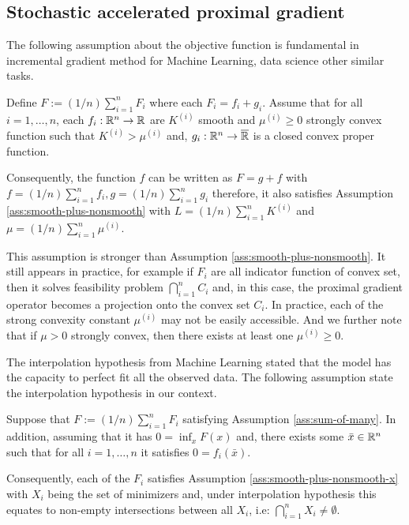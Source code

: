 \documentclass[12pt]{article}
\begin{document}
    \subsection{Stochastic accelerated proximal gradient}
        The following assumption about the objective function is fundamental in incremental gradient method for Machine Learning, data science other similar tasks. 
        \begin{assumption}\label{ass:sum-of-many}
            Define $F := (1/n)\sum_{i = 1}^{n} F_i$ where each $F_i = f_i + g_i$.
            Assume that for all $i = 1, \ldots, n$, each $f_i:\mathbb R^n \rightarrow \mathbb R$ are $K^{(i)}$ smooth and $\mu^{(i)} \ge 0$ strongly convex function such that $K^{(i)} > \mu^{(i)}$ and, $g_i:\mathbb R^n \rightarrow \overline {\mathbb R}$ is a closed convex proper function. 
            \par 
            Consequently, the function $f$ can be written as $F = g + f$ with $f = (1/n)\sum_{i = 1}^{n} f_i, g = (1/n)\sum_{i = 1}^{n}g_i$ therefore, it also satisfies Assumption \ref{ass:smooth-plus-nonsmooth} with $L = (1/n)\sum_{i = 1}^n K^{(i)}$ and $\mu = (1/n)\sum_{i = 1}^{n}\mu^{(i)}$. 
        \end{assumption}
        This assumption is stronger than Assumption \ref{ass:smooth-plus-nonsmooth}. 
        It still appears in practice, for example if $F_i$ are all indicator function of convex set, then it solves feasibility problem $\bigcap_{i = 1}^n C_i$ and, in this case, the proximal gradient operator becomes a projection onto the convex set $C_i$. 
        In practice, each of the strong convexity constant $\mu^{(i)}$ may not be easily accessible. 
        And we further note that if $\mu > 0$ strongly convex, then there exists at least one $\mu^{(i)} \ge 0$. 
        \par
        The interpolation hypothesis from Machine Learning stated that the model has the capacity to perfect fit all the observed data. 
        The following assumption state the interpolation hypothesis in our context. 
        \begin{assumption}\label{ass:interp-hypothesis}
            Suppose that $F := (1/n)\sum_{i = 1}^{n} F_i$ satisfying Assumption \ref{ass:sum-of-many}. 
            In addition, assuming that it has $0 = \inf_{x}F(x)$ and, there exists some $\bar x \in \mathbb R^n$ such that for all $i = 1, \ldots, n$ it satisfies $0 = f_i(\bar x)$. 
            \par
            Consequently, each of the $F_i$ satisfies Assumption \ref{ass:smooth-plus-nonsmooth-x} with $X_i$ being the set of minimizers and, under interpolation hypothesis this equates to non-empty intersections between all $X_i$, i.e: $\bigcap_{i = 1}^n X_i \neq \emptyset$. 
        \end{assumption}
\end{document}
